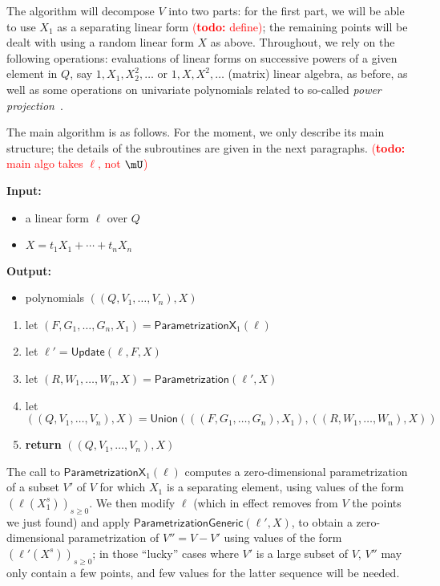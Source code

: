 \documentclass[12pt]{article}
\newcommand{\todo}[1]{\textcolor{red}{({\bf todo:} #1)}}
\newcommand{\lf}{X}
\begin{document}
The algorithm will decompose $V$ into two parts: for the first part,
we will be able to use $X_1$ as a separating linear form
\todo{define}; the remaining points will be dealt with using a random
linear form $\lf$ as above. Throughout, we rely on the following
operations: evaluations of linear forms on successive powers of a
given element in $Q$, say $1,X_1,X_2^2,\dots$ or $1,\lf,\lf^2,\dots$
(matrix) linear algebra, as before, as well as some operations on
univariate polynomials related to so-called {\em power
  projection}~\cite{Shoup94,Shoup99}.

The main algorithm is as follows. For the moment, we only describe its
main structure; the details of the subroutines are given in the next
paragraphs. \todo{main algo takes $\ell$, not $\mU$}

\begin{algorithm}[H]
	\caption{$\mathsf{ParametrizationWithSplitting}(\ell,t)$} {\bf
		Input:} \vspace{-0.5em}
	\begin{itemize}\setlength\itemsep{0em}
		\item a linear form $\ell$ over $Q$
		\item $\lf=t_1 X_1 + \cdots + t_n X_n$
	\end{itemize}
	{\bf Output:} \vspace{-0.5em}
	\begin{itemize}\setlength\itemsep{0em}
		\item polynomials $((Q,V_1,\dots,V_n),\lf)$
	\end{itemize}
	\begin{enumerate}
		\item let $(F,G_1,\dots,G_n,X_1)=\mathsf{ParametrizationX}_1(\ell)$
		\item let $\ell'=\mathsf{Update}(\ell,F,\lf)$
		\item let $(R,W_1,\dots,W_n,\lf)=\mathsf{Parametrization}(\ell',\lf)$
		\item let $((Q,V_1,\dots,V_n),\lf)=\mathsf{Union}(((F,G_1,\dots,G_n),X_1), ((R,W_1,\dots,W_n),\lf))$
		\item \textbf{return} $((Q,V_1,\dots,V_n),\lf)$
	\end{enumerate}
\end{algorithm}

The call to $\mathsf{ParametrizationX}_1(\ell)$ computes a
zero-dimensional parametrization of a subset $V'$ of $V$ for which
$X_1$ is a separating element, using values of the form
$(\ell(X_1^s))_{s \ge 0}$. We then modify $\ell$ (which in effect
removes from $V$ the points we just found) and apply
$\mathsf{ParametrizationGeneric}(\ell',\lf)$, to obtain a
zero-dimensional parametrization of $V''=V-V'$ using values of the
form $(\ell'(\lf^s))_{s \ge 0}$; in those ``lucky'' cases where $V'$ is 
a large subset of $V$, $V''$ may only contain a few points, and
few values for the latter sequence will be needed. 
\end{document}
